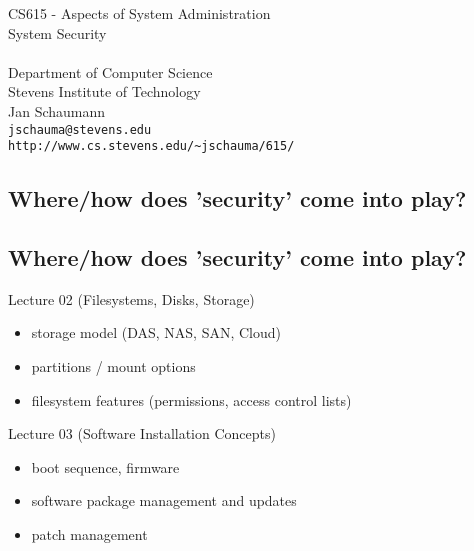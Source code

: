 \documentclass[xga]{xdvislides}
\begin{document}
\setfontphv

\lhead{\slidetitle}                               %
\cfoot{\relax}                               %
\rfoot{\Gray{\today}}
\vspace*{\fill}
\begin{center}
	\Hugesize
		CS615 - Aspects of System Administration\\ [1em]
		System Security\\ [1em]
	\hspace*{5mm}\blueline\\ [1em]
	\Normalsize
		Department of Computer Science\\
		Stevens Institute of Technology\\
		Jan Schaumann\\
		\verb+jschauma@stevens.edu+ \\
		\verb+http://www.cs.stevens.edu/~jschauma/615/+
\end{center}
\vspace*{\fill}

\subsection{Where/how does 'security' come into play?}

\subsection{Where/how does 'security' come into play?}
Lecture 02 (Filesystems, Disks, Storage)
\begin{itemize}
	\item storage model (DAS, NAS, SAN, Cloud)
	\item partitions / mount options
	\item filesystem features (permissions, access control lists)
\end{itemize}
\vspace{.5in}
Lecture 03 (Software Installation Concepts)
\begin{itemize}
	\item boot sequence, firmware
	\item software package management and updates
	\item patch management
\end{itemize}
\end{document}
